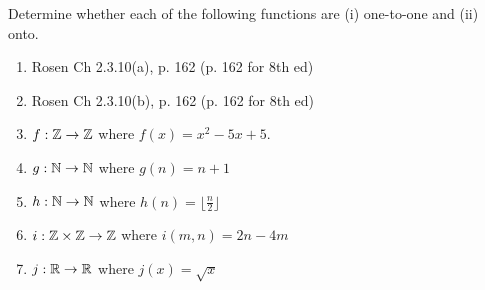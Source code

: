 \begin{questions}




 Determine whether each of the following functions are (i) one-to-one and (ii) onto. 
\begin{enumerate}[label=(\alph*),itemsep=0pt,parsep=0pt,topsep=0pt,partopsep=0pt]
    \item {} 
        Rosen Ch 2.3.10(a), p. 162 (p. 162 for 8th ed)
    \item {}
        Rosen Ch 2.3.10(b), p. 162 (p. 162 for 8th ed)
    \item {}
    	$f: \mathbb{Z} \rightarrow \mathbb{Z}$ where $f(x) = x^2 - 5x + 5$.
    \item {}
    	$g: \mathbb{N} \rightarrow \mathbb{N}$ where $g(n) = n+1$
    \item {}
    	$h: \mathbb{N} \rightarrow \mathbb{N}$ where $h(n) = \lfloor \frac{n}{2} \rfloor$
    \item {}
    	$i: \mathbb{Z} \times \mathbb{Z} \rightarrow \mathbb{Z}$ where $i(m,n) = 2n - 4m$
    \item {}
    	$j: \mathbb{R} \rightarrow \mathbb{R}$ where $j(x) = \sqrt{x}$
\end{enumerate}





\end{questions}
